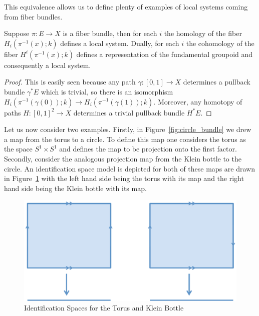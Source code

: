 This equivalence allows us to define plenty of examples of local systems coming from fiber bundles.
\begin{prop}\label{prop:bundles_locsys}
	Suppose $\pi:E\to X$ is a fiber bundle, then for each $i$ the homology of the fiber $H_i(\pi^{-1}(x);k)$ defines a local system. Dually, for each $i$ the cohomology of the fiber $H^i(\pi^{-1}(x);k)$ defines a representation of the fundamental groupoid and consequently a local system.
\end{prop}
\begin{proof}
	This is easily seen because any path $\gamma:[0,1]\to X$ determines a pullback bundle $\gamma^*E$ which is trivial, so there is an isomorphism $H_i(\pi^{-1}(\gamma(0));k)\to H_i(\pi^{-1}(\gamma(1));k)$. Moreover, any homotopy of paths $H:[0,1]^2\to X$ determines a trivial pullback bundle $H^*E$.
\end{proof}

Let us now consider two examples. Firstly, in Figure~\ref{fig:circle_bundle} we drew a map from the torus to a circle. To define this map one considers the torus as the space $S^1\times S^1$ and defines the map to be projection onto the first factor. Secondly, consider the analogous projection map from the Klein bottle to the circle. An identification space model is depicted for both of these maps are drawn in Figure~\ref{fig:torus_klein_id} with the left hand side being the torus with its map and the right hand side being the Klein bottle with its map.

\begin{figure}
\centering
\includegraphics[width=\textwidth]{torus_klein_id.pdf}
\caption{Identification Spaces for the Torus and Klein Bottle}
\label{fig:torus_klein_id}
\end{figure}

